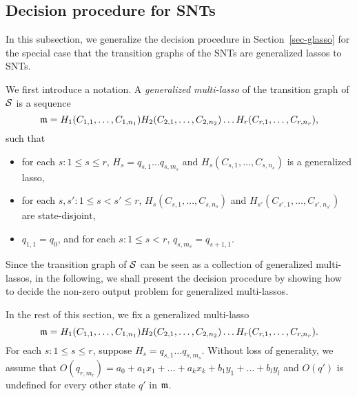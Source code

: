 \subsection{Decision procedure for SNTs}\label{sec-gflat}

In this subsection, we generalize the decision procedure in Section~\ref{sec-glasso} for the special case that the transition graphs of the SNTs are generalized lassos to SNTs.

We first introduce a notation. A \emph{generalized multi-lasso} of the transition graph of ${\mathcal{S} }$ is a sequence 
\[
\mathfrak{m}= H_1 (C_{1,1},\dots,C_{1,n_1}) H_2 (C_{2,1},\dots,C_{2,n_2}) \dots H_r (C_{r,1},\dots, C_{r, n_r}),
\]
such that 
\begin{itemize}
\item for each $s: 1 \le s \le r$, $H_s = q_{s,1} \dots q_{s, m_s}$ and $H_s (C_{s,1},\dots,C_{s, n_s})$ is a generalized lasso, 

\item for each $s, s': 1 \le s < s' \le r$, $H_s (C_{s,1},\dots,C_{s, n_s})$ and $H_{s'} (C_{s', 1},\dots,C_{s', n_{s'}})$ are state-disjoint,

\item $q_{1,1}=q_0$, and for each $s: 1 \le s < r$, $q_{s, m_s}=q_{s+1,1}$.
\end{itemize}

Since the transition graph of ${\mathcal{S} }$ can be seen as a collection of generalized multi-lassos, in the following, we shall present the decision procedure by showing how to decide the non-zero output problem for generalized multi-lassos. 

In the rest of this section, we fix a generalized multi-lasso
\[
\mathfrak{m}= H_1 (C_{1,1},\dots,C_{1,n_1}) H_2 (C_{2,1},\dots,C_{2,n_2}) \dots H_r (C_{r,1},\dots, C_{r, n_r}).
\]
For each $s: 1 \le s \le r$, suppose $H_s=q_{s,1} \dots q_{s, m_s}$. Without loss of generality, we assume that $O(q_{r,m_r})=a_0+a_1 x_1 + \dots + a_k x_k + b_1 y_1  + \dots + b_l y_l$ and $O(q')$ is undefined for every other state $q'$ in $\mathfrak{m}$.




